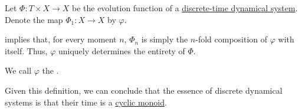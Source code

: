 \begin{definition}\label{def:one_step_evolution_function}\mimprovised
  Let \( \Phi: T \times X \to X \) be the evolution function of a \hyperref[def:discrete_dynamical_system]{discrete-time dynamical system}. Denote the map \( \Phi_1: X \to X \) by \( \varphi \).

   implies that, for every moment \( n \), \( \Phi_n \) is simply the \( n \)-fold composition of \( \varphi \) with itself. Thus, \( \varphi \) uniquely determines the entirety of \( \Phi \).

  We call \( \varphi \) the .
\end{definition}
\begin{comments}
  \item Given this definition, we can conclude that the essence of discrete dynamical systems is that their time is a \hyperref[def:cyclic_monoid]{cyclic monoid}.
\end{comments}

